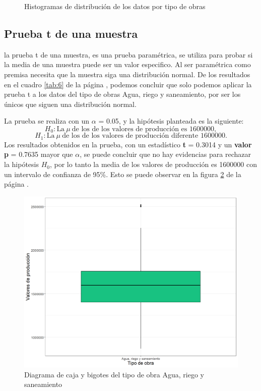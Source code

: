 \documentclass{article}
\begin{document}
\begin{figure}
\label{fig:c}
\vspace{-0.2cm}
\caption{Histogramas de distribución de los datos por tipo de obras}
\label{fig:4} 
\end{figure}

\subsection{Prueba t de una muestra}
\label{sec:10}
la prueba t de una muestra, es una prueba paramétrica, se utiliza para probar si la media de una muestra puede ser un valor especifico. Al ser paramétrica como premisa necesita que la muestra siga una distribución normal. De los resultados en el cuadro \ref{tab:6} de la página \pageref{tab:6}, podemos concluir que solo podemos aplicar la prueba t a los datos del tipo de obras Agua, riego y saneamiento, por ser los únicos que siguen una distribución normal.

La prueba se realiza con un $\alpha$ = 0.05, y la hipótesis planteada es la siguiente: 
\begin{equation}\label{eq:1}
H_{0}:\text{La}\:  \mu\:  \text{de los de los valores de producción es 1600000},    
\end{equation}
\begin{equation}\label{eq:2}
 H_{1}:\text{La}\: \mu \: \text{de los de los valores de producción diferente 1600000}. 
\end{equation}
Los resultados obtenidos en la prueba, con un estadístico \textbf{t} = 0.3014 y un \textbf{valor p} = 0.7635 mayor que $\alpha$, se puede concluir que no hay evidencias para rechazar la hipótesis $H_{0}$, por lo tanto la media de los valores de producción es 1600000 con un intervalo de confianza de 95\%. Esto se puede observar en la figura \ref{fig:7} de la página \pageref{fig:7}.



\begin{figure}
\centering
\includegraphics[scale=0.45]{figuras/TestT.png}
\caption{Diagrama de caja y bigotes del tipo de obra Agua, riego y saneamiento}
\label{fig:7}
\end{figure}
\end{document}
